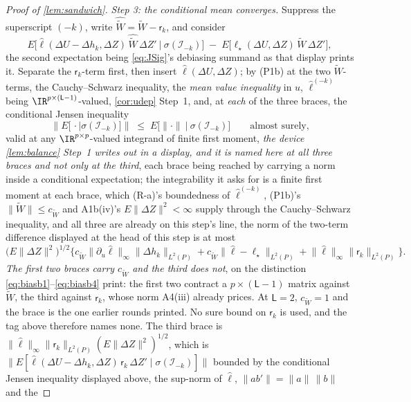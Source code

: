 \begin{proof}[Proof of \cref{lem:sandwich}]
\emph{Step 3: the conditional mean converges.} Suppress the superscript $(-k)$, write
$\widehat{\widetilde W}=\widetilde W-\mathsf r_k$, and consider
\[
E\big[\hat\ell(\Delta U-\Delta h_k,\Delta Z)\,\widehat{\widetilde W}\,\Delta Z'\ \big|\ \sigma(\mathcal I_{-k})\big]
\;-\;E\big[\ell_\star(\Delta U,\Delta Z)\,\widetilde W\,\Delta Z'\big] ,
\]
the second expectation being \eqref{eq:JSig}'s debiasing summand as that display prints it.
Separate the $\mathsf r_k$-term first, then insert $\hat\ell(\Delta U,\Delta Z)$; by
\textup{(P1b)} at the two $\widetilde W$-terms, the
Cauchy--Schwarz inequality, the \emph{mean value inequality} in $u$, 
$\hat\ell^{(-k)}$ being $\IR^{p\times(\mathsf L-1)}$-valued, \cref{cor:udep} Step~1, and, at
\emph{each} of the three braces, the conditional Jensen inequality
\[
\big\|E\big[\,\cdot\mid\sigma(\mathcal I_{-k})\big]\big\|
\;\le\;E\big[\|\cdot\|\ \big|\ \sigma(\mathcal I_{-k})\big]
\qquad\text{almost surely,}
\]
valid at any $\IR^{p\times p}$-valued integrand of finite first moment, \emph{the device
\cref{lem:balance} Step~1 writes out in a
display, and it is named here at all three braces and not only at the third}, each brace being reached
by carrying a norm inside a conditional expectation; the integrability it asks for is a finite first
moment at each brace, which \textup{(R-a)}'s boundedness of $\hat\ell^{(-k)}$,
\textup{(P1b)}'s $\|\widetilde W\|\le c_{\widetilde W}$ and A1b(iv)'s $E\|\Delta Z\|^{2}<\infty$ supply
through the Cauchy--Schwarz inequality, and all three are already on this step's line, the norm of
the two-term difference displayed at the head of this step is at most
\[
\big(E\|\Delta Z\|^{2}\big)^{1/2}
\Big\{c_{\widetilde W}\big\|\partial_u\hat\ell\big\|_\infty\big\|\Delta h_k\big\|_{L^{2}(P)}
+c_{\widetilde W}\big\|\hat\ell-\ell_\star\big\|_{L^{2}(P)}
+\big\|\hat\ell\big\|_\infty\big\|\mathsf r_k\big\|_{L^{2}(P)}\Big\} .
\]
\emph{The first two braces carry $c_{\widetilde W}$ and the third does not}, on the distinction
\eqref{eq:biasb1}--\eqref{eq:biasb4} print: the first two contract a $p\times(\mathsf L-1)$ matrix against
$\widetilde W$, the third against $\mathsf r_k$, whose norm A4(iii) already prices. At
$\mathsf L=2$, $c_{\widetilde W}=1$ and the brace is the one earlier rounds printed.
No sure bound on $\mathsf r_k$ is used, and the tag above therefore names none. The third brace is
$\|\hat\ell\|_\infty\|\mathsf r_k\|_{L^{2}(P)}(E\|\Delta Z\|^{2})^{1/2}$, which is
$\|E[\hat\ell(\Delta U-\Delta h_k,\Delta Z)\,\mathsf r_k\,\Delta Z'\mid\sigma(\mathcal I_{-k})]\|$ bounded by
the conditional Jensen inequality displayed above, the sup-norm of $\hat\ell$, $\|ab'\|=\|a\|\,\|b\|$ and the

\end{proof}
